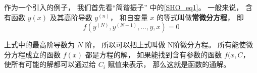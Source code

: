 

作为一个引入的例子， 我们首先看“简谐振子” 中的\autoref{SHO_eq1}。 一般来说， 含有函数 $y(x)$ 及其高阶导数 $y^{(n)}$， 和自变量 $x$ 的等式叫做\textbf{常微分方程}， 即
\begin{equation}
f(y^{(N)}, y^{(N-1)}, \dots, y, x) = 0
\end{equation}

上式中的最高阶导数为 $N$ 阶， 所以可以把上式叫做 N阶微分方程。 所有能使微分方程成立的函数 $f(x)$ 都是方程的解， 如果能找到含有参数的函数 $f(x,C$， 使所有可能的解都可以通过给 $C_i$ 赋值来表示， 那么这就是函数的通解。